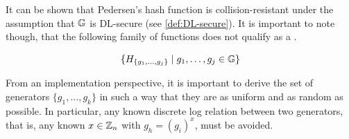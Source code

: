 It can be shown that Pedersen’s  hash  function  is  collision-resistant under the assumption that $\mathbb{G}$ is DL-secure (see \secname \ref{def:DL-secure}). It is important to note though, that the following family of functions does not qualify as a .

\begin{equation}
\label{Pedersen_not_pseudorandom}
\{H_{\{g_1,\ldots,g_j\}}\;|\;g_1,\ldots,g_j\in \mathbb{G}\}
\end{equation}

From an implementation perspective, it is important to derive the set of generators $\{g_1,\ldots,g_k\}$ in such a way that they are as uniform and as random as possible. In particular, any known discrete log relation between two generators, that is, any known $x\in \mathbb{Z}_n$ with $g_h = (g_i)^x$, must be avoided.

